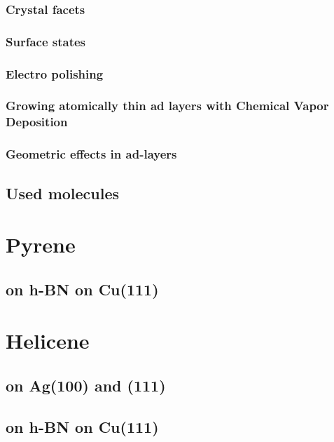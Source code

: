 \documentclass[
10pt,					%
a4paper,				%
twoside,				%
BCOR=8mm,				%
headings=normal,		%
headsepline,			%
footsepline,			%
plainfootsepline,		%
]{scrbook}
\begin{document}
     \subsection{Crystal facets}
        
     \subsection{Surface states}
		
     \subsection{Electro polishing}
    	
     \subsection{Growing atomically thin ad layers with \textbf{C}hemical \textbf{V}apor \textbf{D}eposition}
             
     \subsection{Geometric effects in ad-layers}
		
  \section{Used molecules}
    
\chapter{Pyrene}
\section{on h-BN on Cu(111)}

\chapter{Helicene}
\section{on Ag(100) and (111)}
\section{on h-BN on Cu(111)}

\end{document}
